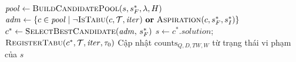 \documentclass[../DoAn.tex]{subfiles}
\begin{document}
\begin{algorithm}[ht]
\caption{Adaptive Tabu Search (Phần 2/2): Thân vòng lặp thông thường}
\label{alg:ts2}
$\mathit{pool} \leftarrow \textsc{BuildCandidatePool}(s, s^*_F, \lambda, H)$\;
$\mathit{adm} \leftarrow \{c \in \mathit{pool} \mid \neg\textsc{IsTabu}(c,\mathcal{T},\mathit{iter})\ \mathbf{or}\ \textsc{Aspiration}(c, s^*_F, s^*_I)\}$\;
$c^* \leftarrow \textsc{SelectBestCandidate}(\mathit{adm},\, s^*_F)$\;
$s \leftarrow c^*.\mathit{solution}$;\quad $\textsc{RegisterTabu}(c^*, \mathcal{T}, \mathit{iter}, \tau_0)$\;
Cập nhật $\text{counts}_{Q,D,TW,W}$ từ trạng thái vi phạm của $s$\;
\end{algorithm}
\end{document}
